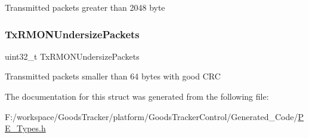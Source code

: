 Transmitted packets greater than 2048 byte \mbox{\label{struct_l_d_d___e_t_h___t_stats_aa5e199c7e3b38fc86eaefee994d96084}} 
\subsubsection{\texorpdfstring{Tx\+R\+M\+O\+N\+Undersize\+Packets}{TxRMONUndersizePackets}}
{\footnotesize\ttfamily uint32\+\_\+t Tx\+R\+M\+O\+N\+Undersize\+Packets}

Transmitted packets smaller than 64 bytes with good C\+RC 

The documentation for this struct was generated from the following file\+:\begin{DoxyCompactItemize}
\item 
F\+:/workspace/\+Goods\+Tracker/platform/\+Goods\+Tracker\+Control/\+Generated\+\_\+\+Code/\hyperlink{_p_e___types_8h}{P\+E\+\_\+\+Types.\+h}\end{DoxyCompactItemize}
